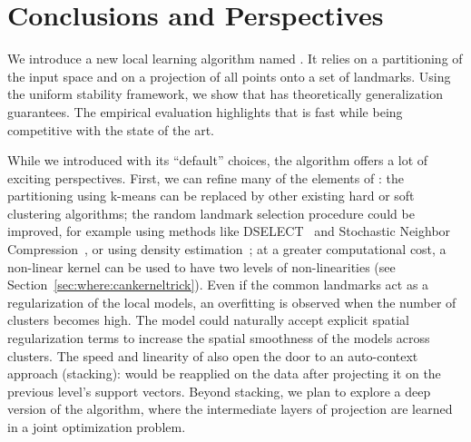 \section{Conclusions and Perspectives}
\label{sec:conclpersp}

We introduce a new local learning algorithm named \landSVM.
It relies on a partitioning of the input space and on a projection of all points onto a set of landmarks.
Using the uniform stability framework, we show that \landSVM has theoretically generalization guarantees.
The empirical evaluation highlights that \landSVM is fast while being competitive with the state of the art.

While we introduced \landSVM with its ``default'' choices, the algorithm offers a lot of exciting perspectives.
First, we can refine many of the elements of \landSVM:
the partitioning using k-means can be replaced by other existing hard or soft clustering algorithms;
the random landmark selection procedure could be improved, for example using methods like DSELECT~\cite{kar2011similarity} and Stochastic Neighbor Compression~\cite{kusner2014stochastic}, or using density estimation~\cite{liu2016stein};
at a greater computational cost, a non-linear kernel can be used to have two levels of non-linearities (see Section~\ref{sec:where:cankerneltrick}).
Even if the common landmarks act as a regularization of the local models, an overfitting is observed when the number of clusters becomes high.
The model could naturally accept explicit spatial regularization terms to increase the spatial smoothness of the models across clusters.
The speed and linearity of \landSVM also open the door to an auto-context approach (stacking): \landSVM would be reapplied on the data after projecting it on the previous level's support vectors.
Beyond stacking, we plan to explore a deep version of the algorithm, where the intermediate layers of projection are learned in a joint optimization problem.

